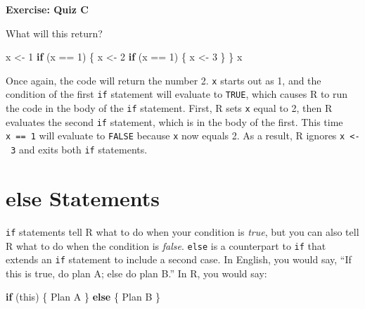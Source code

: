 \documentclass[
  letterpaper,
  DIV=11,
  numbers=noendperiod]{scrbook}
\newenvironment{Shaded}{\begin{snugshade}}{\end{snugshade}}
\newcommand{\ControlFlowTok}[1]{\textcolor[rgb]{0.00,0.23,0.31}{\textbf{#1}}}
\newcommand{\DecValTok}[1]{\textcolor[rgb]{0.68,0.00,0.00}{#1}}
\newcommand{\NormalTok}[1]{\textcolor[rgb]{0.00,0.23,0.31}{#1}}
\newcommand{\OtherTok}[1]{\textcolor[rgb]{0.00,0.23,0.31}{#1}}
\newcommand{\SpecialCharTok}[1]{\textcolor[rgb]{0.37,0.37,0.37}{#1}}
\begin{document}
\begin{tcolorbox}[enhanced jigsaw, left=2mm, breakable, colback=white, colframe=quarto-callout-color-frame, leftrule=.75mm, bottomrule=.15mm, arc=.35mm, opacityback=0, rightrule=.15mm, toprule=.15mm]

\vspace{-3mm}\textbf{Exercise: Quiz C}\vspace{3mm}

What will this return?

\begin{Shaded}
\begin{Highlighting}[]
\NormalTok{x }\OtherTok{\textless{}{-}} \DecValTok{1}
\ControlFlowTok{if}\NormalTok{ (x }\SpecialCharTok{==} \DecValTok{1}\NormalTok{) \{}
\NormalTok{  x }\OtherTok{\textless{}{-}} \DecValTok{2}
  \ControlFlowTok{if}\NormalTok{ (x }\SpecialCharTok{==} \DecValTok{1}\NormalTok{) \{}
\NormalTok{    x }\OtherTok{\textless{}{-}} \DecValTok{3}
\NormalTok{  \}}
\NormalTok{\}}
\NormalTok{x}
\end{Highlighting}
\end{Shaded}

\end{tcolorbox}

Once again, the code will return the number 2. \texttt{x} starts out as
1, and the condition of the first \texttt{if} statement will evaluate to
\texttt{TRUE}, which causes R to run the code in the body of the
\texttt{if} statement. First, R sets \texttt{x} equal to 2, then R
evaluates the second \texttt{if} statement, which is in the body of the
first. This time \texttt{x\ ==\ 1} will evaluate to \texttt{FALSE}
because \texttt{x} now equals 2. As a result, R ignores
\texttt{x\ \textless{}-\ 3} and exits both \texttt{if} statements.

\section{else Statements}\label{else-statements}

\texttt{if} statements tell R what to do when your condition is
\emph{true}, but you can also tell R what to do when the condition is
\emph{false}. \texttt{else} is a counterpart to \texttt{if} that extends
an \texttt{if} statement to include a second case. In English, you would
say, ``If this is true, do plan A; else do plan B.'' In R, you would
say:

\begin{Shaded}
\begin{Highlighting}[]
\ControlFlowTok{if}\NormalTok{ (this) \{}
\NormalTok{  Plan A}
\NormalTok{\} }\ControlFlowTok{else}\NormalTok{ \{}
\NormalTok{  Plan B}
\NormalTok{\}}
\end{Highlighting}
\end{Shaded}
\end{document}
